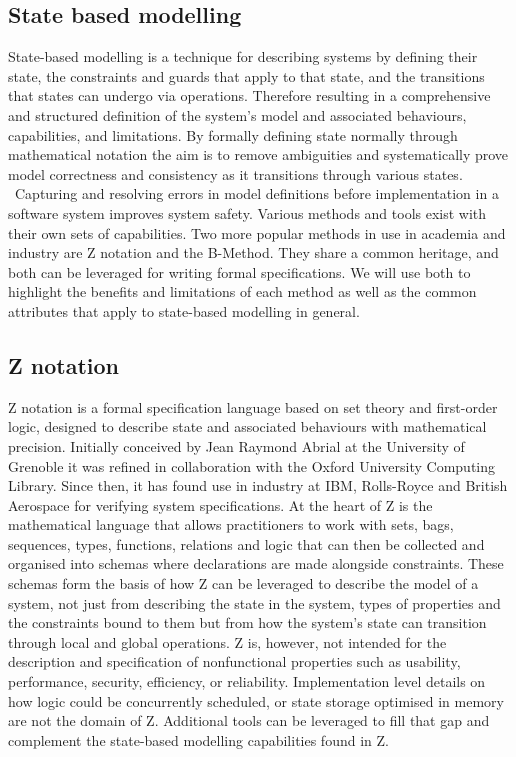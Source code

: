 \documentclass{article}
\begin{document}
\subsection*{State based modelling}

State-based modelling is a technique for describing systems by defining their state, the constraints and guards that apply to that state, and the transitions that states can undergo via operations. Therefore resulting in a comprehensive and structured definition of the system's model and associated behaviours, capabilities, and limitations.
\newline \newline
By formally defining state normally through mathematical notation the aim is to remove ambiguities and systematically prove model correctness and consistency as it transitions through various states.  Capturing and resolving errors in model definitions before implementation in a software system improves system safety.
\newline \newline
Various methods and tools exist with their own sets of capabilities. Two more popular methods in use in academia and industry are Z notation and the B-Method. They share a common heritage, and both can be leveraged for writing formal specifications. We will use both to highlight the benefits and limitations of each method as well as the common attributes that apply to state-based modelling in general.

\subsection*{Z notation}

Z notation is a formal specification language based on set theory and first-order logic, designed to describe state and associated behaviours with mathematical precision. Initially conceived by Jean Raymond Abrial at the University of Grenoble it was refined in collaboration with the Oxford University Computing Library. Since then, it has found use in industry at IBM, Rolls-Royce and British Aerospace for verifying system specifications.
\newline \newline
At the heart of Z is the mathematical language that allows practitioners to work with sets, bags, sequences, types, functions, relations and logic that can then be collected and organised into schemas where declarations are made alongside constraints. These schemas form the basis of how Z can be leveraged to describe the model of a system, not just from describing the state in the system, types of properties and the constraints bound to them but from how the system’s state can transition through local and global operations.
\newline \newline
Z is, however, not intended for the description and specification of nonfunctional properties such as usability, performance, security, efficiency, or reliability. Implementation level details on how logic could be concurrently scheduled, or state storage optimised in memory are not the domain of Z. Additional tools can be leveraged to fill that gap and complement the state-based modelling capabilities found in Z.
\end{document}
